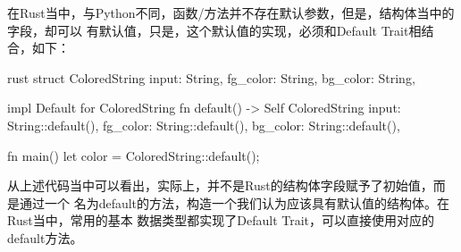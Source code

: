 在Rust当中，与Python不同，函数/方法并不存在默认参数，但是，结构体当中的字段，却可以
有默认值，只是，这个默认值的实现，必须和Default Trait相结合，如下：
\begin{code-block}{rust}
struct ColoredString {
    input: String,
    fg_color: String,
    bg_color: String,
}

impl Default for ColoredString {
    fn default() -> Self {
        ColoredString {
            input: String::default(),
            fg_color: String::default(),
            bg_color: String::default(),
        }
    }
}

fn main() {
    let color = ColoredString::default();
}
\end{code-block}
从上述代码当中可以看出，实际上，并不是Rust的结构体字段赋予了初始值，而是通过一个
名为default的方法，构造一个我们认为应该具有默认值的结构体。在Rust当中，常用的基本
数据类型都实现了Default Trait，可以直接使用对应的default方法。


